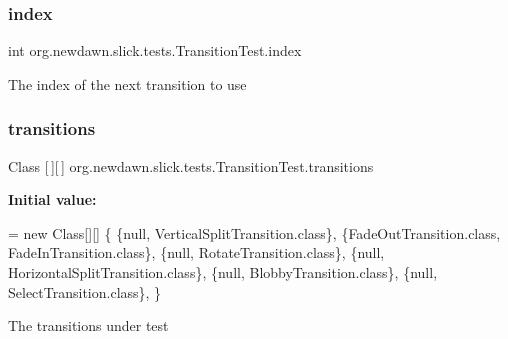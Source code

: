 \subsubsection{\texorpdfstring{index}{index}}
{\footnotesize\ttfamily int org.\+newdawn.\+slick.\+tests.\+Transition\+Test.\+index\hspace{0.3cm}{\ttfamily [private]}}

The index of the next transition to use \mbox{\label{classorg_1_1newdawn_1_1slick_1_1tests_1_1_transition_test_a9dcb9c54401d0e66c4393216f5c85b27}} 
\subsubsection{\texorpdfstring{transitions}{transitions}}
{\footnotesize\ttfamily Class \mbox{[}$\,$\mbox{]}\mbox{[}$\,$\mbox{]} org.\+newdawn.\+slick.\+tests.\+Transition\+Test.\+transitions\hspace{0.3cm}{\ttfamily [private]}}

{\bfseries Initial value\+:}
\begin{DoxyCode}
= \textcolor{keyword}{new} Class[][] \{
            \{null, VerticalSplitTransition.class\},
            \{FadeOutTransition.class, FadeInTransition.class\},
            \{null, RotateTransition.class\},
            \{null, HorizontalSplitTransition.class\},
            \{null, BlobbyTransition.class\},
            \{null, SelectTransition.class\},
    \}
\end{DoxyCode}
The transitions under test 